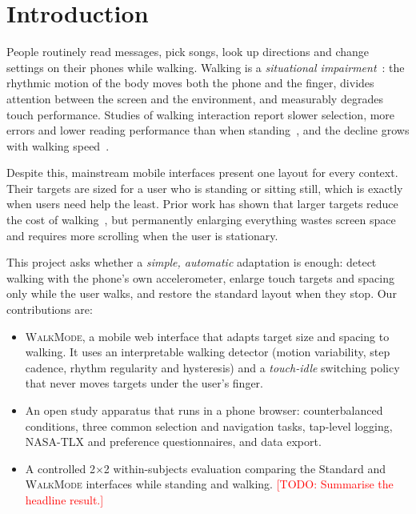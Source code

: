 \documentclass[sigconf,nonacm]{acmart}
\newcommand{\todo}[1]{\textcolor{red}{[TODO: #1]}}
\newcommand{\WM}{\textsc{WalkMode}}
\begin{document}
\section{Introduction}

People routinely read messages, pick songs, look up directions and change settings on their phones while walking. Walking is a \emph{situational impairment}~\cite{sears2003fade}: the rhythmic motion of the body moves both the phone and the finger, divides attention between the screen and the environment, and measurably degrades touch performance. Studies of walking interaction report slower selection, more errors and lower reading performance than when standing~\cite{lin2007tap,kane2008walking,schildbach2010walking,bergstrom2011speed}, and the decline grows with walking speed~\cite{bergstrom2011speed,mizobuchi2005walking}.

Despite this, mainstream mobile interfaces present one layout for every context. Their targets are sized for a user who is standing or sitting still, which is exactly when users need help the least. Prior work has shown that larger targets reduce the cost of walking~\cite{kane2008walking,schildbach2010walking}, but permanently enlarging everything wastes screen space and requires more scrolling when the user is stationary.

This project asks whether a \emph{simple, automatic} adaptation is enough: detect walking with the phone's own accelerometer, enlarge touch targets and spacing only while the user walks, and restore the standard layout when they stop. Our contributions are:
\begin{itemize}
  \item \WM{}, a mobile web interface that adapts target size and spacing to walking. It uses an interpretable walking detector (motion variability, step cadence, rhythm regularity and hysteresis) and a \emph{touch-idle} switching policy that never moves targets under the user's finger.
  \item An open study apparatus that runs in a phone browser: counterbalanced conditions, three common selection and navigation tasks, tap-level logging, NASA-TLX and preference questionnaires, and data export.
  \item A controlled 2$\times$2 within-subjects evaluation comparing the Standard and \WM{} interfaces while standing and walking. \todo{Summarise the headline result.}
\end{itemize}
\end{document}
